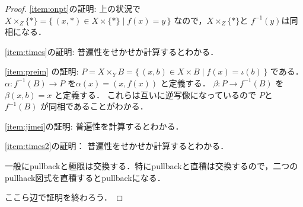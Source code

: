 \documentclass[leqno, a4paper, 12pt, dvipdfmx]{jsarticle}
\begin{document}
\begin{proof}
\ref{item:onpt}の証明:
上の状況で
$X\times_{Z}\{*\}=\{\, (x, *)\in X\times \{*\}\mid f(x)=y\, \}$
なので，$X\times_{Z}\{*\}$と
$f^{-1}(y)$は同相になる．

\ref{item:times}の証明:
普遍性をせかせか計算するとわかる．


\ref{item:preim}
の証明:
$P=X\times_{Y}B=\{\, (x, b)\in X\times B\mid f(x)=\iota(b)\, \}$
である．
$\alpha\colon f^{-1}(B)\to P$
を$\alpha(x)=(x, f(x))$
と定義する．
$\beta\colon P\to f^{-1}(B)$
を$\beta(x, b)=x$
と定義する．
これらは互いに逆写像になっているので
$P$と$f^{-1}(B)$
が同相であることがわかる．

\ref{item:jimei}の証明:
普遍性を計算するとわかる．


\ref{item:times2}の証明：
普遍性をせかせか計算するとわかる．

一般にpullbackと極限は交換する．特にpullbackと直積は交換するので，二つのpullhack図式を直積するとpullbackになる．


ここら辺で証明を終わろう．
\end{proof}
\end{document}
